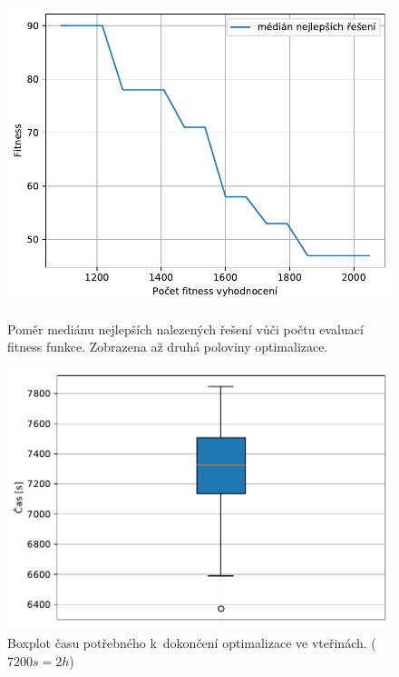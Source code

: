 \begin{figure}[H]

\begin{minipage}[t]{0.475\linewidth}
	\includegraphics[width=\textwidth]{obrazky-figures/statistics/HIFU/blob/4/PSO/bestsToFitness_1.pdf}
	\caption{Poměr mediánu nejlepších nalezených řešení vůči počtu evaluací fitness funkce. Zobrazena až druhá poloviny optimalizace.}
	\label{fg:hifu:pso:fitPerf}
\end{minipage}
\hfill
\begin{minipage}[t]{0.475\linewidth}
\includegraphics[width=\linewidth]{obrazky-figures/statistics/HIFU/blob/4/PSO/timeBoxplot_WithOutliers.pdf}
\caption{Boxplot času potřebného k~dokončení optimalizace ve vteřinách. ($7200s = 2h$)}
\label{fg:hifu:pso:time}
\end{minipage}
\end{figure}

